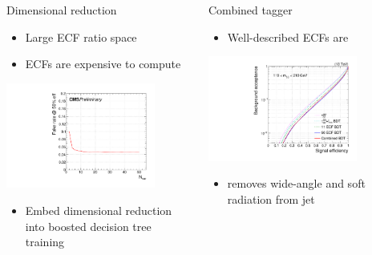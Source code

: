 \documentclass[aspectratio=169,xcolor=dvipsnames,,table,compress]{beamer}
\begin{document}
\begin{frame}[t]
\begin{columns}[T]
\begin{column}{0.33\textwidth}
  \end{column}
  \begin{column}{0.33\textwidth}
  \centering 
    Dimensional reduction \\  
  \begin{itemize}
    \item {\small Large ECF ratio space}
    \item {\small ECFs are expensive to compute }
  \end{itemize}
      \includegraphics[width=0.8\textwidth]{../figures/toptagging/bdt/fakerate_vs_eff50.pdf}
      \vspace{-5mm}
  \begin{itemize}
    \item {\small Embed dimensional reduction into boosted decision tree training}
  \end{itemize}
  \end{column}
  \begin{column}{0.33\textwidth}
    \centering 
    Combined tagger \\ 
    \begin{itemize}
      \item {\small Well-described ECFs are }
    \end{itemize}
      \includegraphics[width=0.8\textwidth]{../figures/toptagging/bdt/roc.pdf}
      \vspace{-3mm}
    \begin{itemize}
      \item {\small {} removes wide-angle and soft radiation from jet}
    \end{itemize}
  \end{column}
  \end{columns}
\end{frame}
\end{document}
